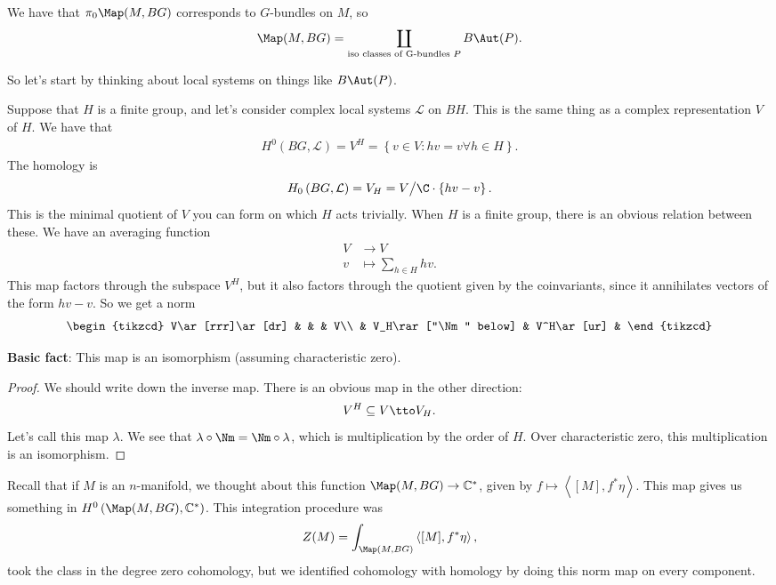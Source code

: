 We have that $\pi_0 \Map(M,BG)$ corresponds to $G$-bundles on $M$, so
\begin{align*}
    \Map(M,BG) = \coprod_{\text{iso classes of G-bundles } P} B\Aut(P).
\end{align*}

So let's start by thinking about local systems on things like $B\Aut(P)$.

Suppose that $H$ is a finite group, and let's consider complex local systems $\mathcal{L}$ on $BH$. This is the same thing as a complex representation $V$ of $H$. We have that
\begin{align*}
    H^0 \left( BG, \mathcal{L} \right) = V^H = \left\{ v\in V \colon hv=v \forall h \in H \right\}.
\end{align*}
The homology is
\begin{align*}
    H_0 \left( BG, \mathcal{L} \right) = V_H = V \big/\C\cdot \left\{ hv-v \right\}.
\end{align*}
This is the minimal quotient of $V$ you can form on which $H$ acts trivially. When $H$ is a finite group, there is an obvious relation between these. We have an averaging function
\begin{align*}
    V &\to V \\
    v &\mapsto \sum_{h\in H} hv.
\end{align*}
This map factors through the subspace $V^H$, but it also factors through the quotient given by the coinvariants, since it annihilates vectors of the form $hv-v$. So we get a norm
\[ \begin{tikzcd}
    V\ar[rrr]\ar[dr] &  &  & V\\
     & V_H\rar["\Nm" below] & V^H\ar[ur] & 
\end{tikzcd} \]

\textbf{Basic fact}: This map is an isomorphism (assuming characteristic zero).
\begin{proof} We should write down the inverse map. There is an obvious map in the other direction:
\begin{align*}
    V^H \subseteq V \tto V_H.
\end{align*}
Let's call this map $\lambda$. We see that $\lambda \circ \Nm = \Nm \circ \lambda$, which is multiplication by the order of $H$. Over characteristic zero, this multiplication is an isomorphism.
\end{proof}

\begin{remark} Recall that if $M$ is an $n$-manifold, we thought about this function $\Map(M,BG) \to \mathbb{C}^\ast$, given by $f \mapsto \left\langle [M], f^\ast \eta \right\rangle$. This map gives us something in $H^0 \left( \Map(M,BG), \mathbb{C}^\ast \right)$. This integration procedure was
\begin{align*}
    Z(M) = \int_{\Map(M,BG)} \left\langle [M], f^\ast \eta \right\rangle,
\end{align*}
took the class in the degree zero cohomology, but we identified cohomology with homology by doing this norm map on every component.
\end{remark}


